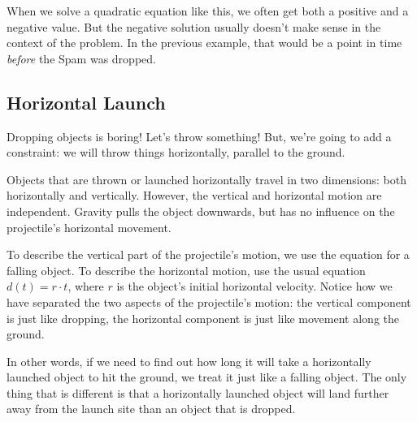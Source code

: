 When we solve a quadratic equation like this, we often get both a positive and a negative value. But the negative solution usually doesn't make sense in the context of the problem. In the previous example, that would be a point in time \textit{before} the Spam was dropped.

\subsection{Horizontal Launch}

Dropping objects is boring! Let's throw something! But, we're going to add a constraint: we will throw things horizontally, parallel to the ground.

Objects that are thrown or launched horizontally travel in two dimensions: both horizontally and vertically. However, the vertical and horizontal motion are independent. Gravity pulls the object downwards, but has no influence on the projectile's horizontal movement.

To describe the vertical part of the projectile's motion, we use the equation for a falling object. To describe the horizontal motion, use the usual equation $d(t) = r\cdot t$, where $r$ is the object's initial horizontal velocity. Notice how we have separated the two aspects of the projectile's motion: the vertical component is just like dropping, the horizontal component is just like movement along the ground.

In other words, if we need to find out how long it will take a horizontally launched object to hit the ground, we treat it just like a falling object. The only thing that is different is that a horizontally launched object will land further away from the launch site than an object that is dropped.

